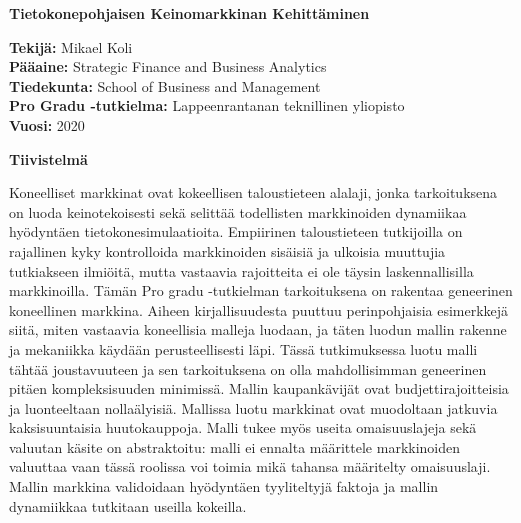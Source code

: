 

\thispagestyle{plain}
\begin{center}
    \Large
    \textbf{Tietokonepohjaisen Keinomarkkinan Kehitt\"aminen}
        
    \vspace{0.4cm}
    \large
        
    \vspace{0.4cm}
    \begin{flushleft}
        \textbf{Tekijä:} Mikael Koli\\
        \textbf{Pääaine:} Strategic Finance and Business Analytics \\
        \textbf{Tiedekunta:} School of Business and Management \\
        \textbf{Pro Gradu -tutkielma:} Lappeenrantanan teknillinen yliopisto  \\
        \textbf{Vuosi:} 2020
    \end{flushleft}
       
    \vspace{0.9cm}
    \textbf{Tiivistelmä}
\end{center}

Koneelliset markkinat ovat kokeellisen taloustieteen alalaji, jonka tarkoituksena
on luoda keinotekoisesti sekä selittää todellisten markkinoiden dynamiikaa hyödyntäen
tietokonesimulaatioita. Empiirinen taloustieteen tutkijoilla on rajallinen kyky kontrolloida
markkinoiden sisäisiä ja ulkoisia muuttujia tutkiakseen ilmiöitä, mutta vastaavia rajoitteita
ei ole täysin laskennallisilla markkinoilla. Tämän Pro gradu -tutkielman tarkoituksena on rakentaa
geneerinen koneellinen markkina. Aiheen kirjallisuudesta puuttuu perinpohjaisia esimerkkejä siitä,
miten vastaavia koneellisia malleja luodaan, ja täten luodun mallin rakenne ja mekaniikka käydään
perusteellisesti läpi. Tässä tutkimuksessa luotu malli tähtää joustavuuteen ja sen tarkoituksena on
olla mahdollisimman geneerinen pitäen kompleksisuuden minimissä. Mallin kaupankävijät ovat budjettirajoitteisia
ja luonteeltaan nollaälyisiä. Mallissa luotu markkinat ovat muodoltaan jatkuvia
kaksisuuntaisia huutokauppoja. Malli tukee myös useita omaisuuslajeja sekä valuutan käsite on abstraktoitu: 
malli ei ennalta määrittele markkinoiden valuuttaa vaan tässä roolissa voi toimia mikä tahansa määritelty
omaisuuslaji. Mallin markkina validoidaan hyödyntäen tyyliteltyjä faktoja ja mallin dynamiikkaa
tutkitaan useilla kokeilla.

